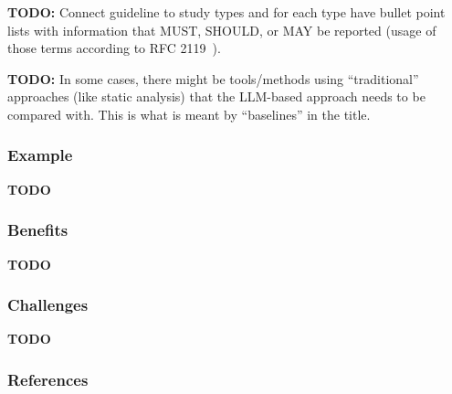 \documentclass[11pt]{article}
\begin{document}
\textbf{TODO:} Connect guideline to study types and for each type have bullet point lists with information that MUST, SHOULD, or MAY be reported (usage of those terms according to RFC 2119~\cite{rfc2119}).

\textbf{TODO:} In some cases, there might be tools/methods using ``traditional'' approaches (like static analysis) that the LLM-based approach needs to be compared with. This is what is meant by ``baselines'' in the title.

\subsubsection{Example}

\textbf{TODO}

\subsubsection{Benefits}

\textbf{TODO}

\subsubsection{Challenges}

\textbf{TODO}

\subsubsection{References}



\end{document}

